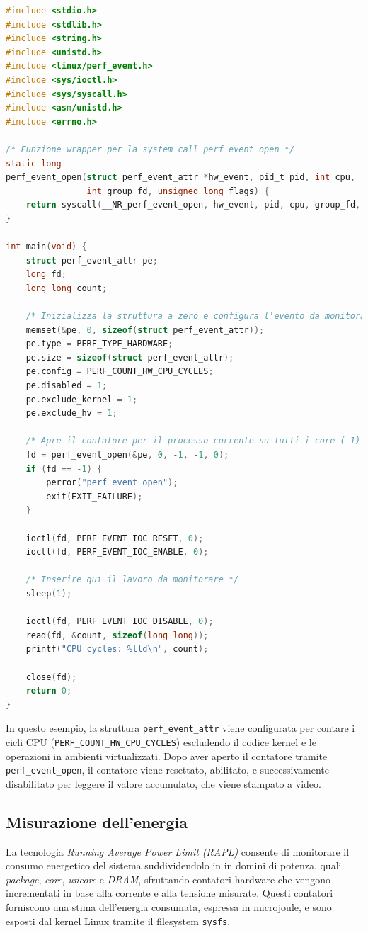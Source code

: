 \documentclass{article}
\begin{document}
\begin{lstlisting}[language=C, caption={Esempio di utilizzo di \texttt{perf\_event\_open} per contare i cicli CPU}]
#include <stdio.h>
#include <stdlib.h>
#include <string.h>
#include <unistd.h>
#include <linux/perf_event.h>
#include <sys/ioctl.h>
#include <sys/syscall.h>
#include <asm/unistd.h>
#include <errno.h>

/* Funzione wrapper per la system call perf_event_open */
static long
perf_event_open(struct perf_event_attr *hw_event, pid_t pid, int cpu,
                int group_fd, unsigned long flags) {
    return syscall(__NR_perf_event_open, hw_event, pid, cpu, group_fd, flags);
}

int main(void) {
    struct perf_event_attr pe;
    long fd;
    long long count;

    /* Inizializza la struttura a zero e configura l'evento da monitorare */
    memset(&pe, 0, sizeof(struct perf_event_attr));
    pe.type = PERF_TYPE_HARDWARE;
    pe.size = sizeof(struct perf_event_attr);
    pe.config = PERF_COUNT_HW_CPU_CYCLES;
    pe.disabled = 1;
    pe.exclude_kernel = 1;
    pe.exclude_hv = 1;

    /* Apre il contatore per il processo corrente su tutti i core (-1) */
    fd = perf_event_open(&pe, 0, -1, -1, 0);
    if (fd == -1) {
        perror("perf_event_open");
        exit(EXIT_FAILURE);
    }

    ioctl(fd, PERF_EVENT_IOC_RESET, 0);
    ioctl(fd, PERF_EVENT_IOC_ENABLE, 0);

    /* Inserire qui il lavoro da monitorare */
    sleep(1);

    ioctl(fd, PERF_EVENT_IOC_DISABLE, 0);
    read(fd, &count, sizeof(long long));
    printf("CPU cycles: %lld\n", count);

    close(fd);
    return 0;
}
\end{lstlisting}

In questo esempio, la struttura \texttt{perf\_event\_attr} viene configurata per contare i cicli CPU (\texttt{PERF\_COUNT\_HW\_CPU\_CYCLES}) escludendo il codice kernel e le operazioni in ambienti virtualizzati. Dopo aver aperto il contatore tramite \texttt{perf\_event\_open}, il contatore viene resettato, abilitato, e successivamente disabilitato per leggere il valore accumulato, che viene stampato a video.

\subsection{Misurazione dell'energia}
La tecnologia \emph{Running Average Power Limit (RAPL)}\cite{rapl-docs} consente di monitorare il consumo energetico del sistema suddividendolo in in domini di potenza, quali \textit{package}, \textit{core}, \textit{uncore} e \textit{DRAM},  sfruttando contatori hardware che vengono incrementati in base alla corrente e alla tensione misurate. Questi contatori forniscono una stima dell'energia consumata, espressa in microjoule, e sono esposti dal kernel Linux tramite il filesystem \texttt{sysfs}.
\end{document}
